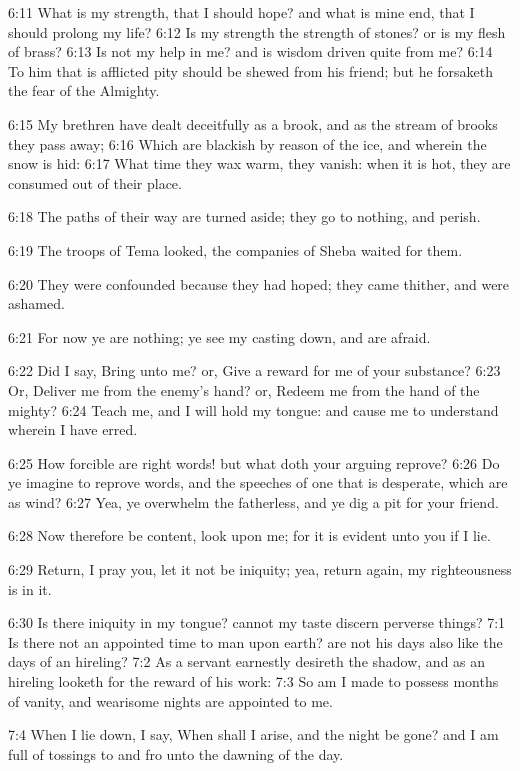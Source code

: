6:11 What is my strength, that I should hope? and what is mine end, that I should prolong my life?  6:12 Is my strength the strength of stones? or is my flesh of brass?  6:13 Is not my help in me? and is wisdom driven quite from me?  6:14 To him that is afflicted pity should be shewed from his friend; but he forsaketh the fear of the Almighty.

6:15 My brethren have dealt deceitfully as a brook, and as the stream of brooks they pass away; 6:16 Which are blackish by reason of the ice, and wherein the snow is hid: 6:17 What time they wax warm, they vanish: when it is hot, they are consumed out of their place.

6:18 The paths of their way are turned aside; they go to nothing, and perish.

6:19 The troops of Tema looked, the companies of Sheba waited for them.

6:20 They were confounded because they had hoped; they came thither, and were ashamed.

6:21 For now ye are nothing; ye see my casting down, and are afraid.

6:22 Did I say, Bring unto me? or, Give a reward for me of your substance?  6:23 Or, Deliver me from the enemy's hand? or, Redeem me from the hand of the mighty?  6:24 Teach me, and I will hold my tongue: and cause me to understand wherein I have erred.

6:25 How forcible are right words! but what doth your arguing reprove?  6:26 Do ye imagine to reprove words, and the speeches of one that is desperate, which are as wind?  6:27 Yea, ye overwhelm the fatherless, and ye dig a pit for your friend.

6:28 Now therefore be content, look upon me; for it is evident unto you if I lie.

6:29 Return, I pray you, let it not be iniquity; yea, return again, my righteousness is in it.

6:30 Is there iniquity in my tongue? cannot my taste discern perverse things?  7:1 Is there not an appointed time to man upon earth? are not his days also like the days of an hireling?  7:2 As a servant earnestly desireth the shadow, and as an hireling looketh for the reward of his work: 7:3 So am I made to possess months of vanity, and wearisome nights are appointed to me.

7:4 When I lie down, I say, When shall I arise, and the night be gone?  and I am full of tossings to and fro unto the dawning of the day.

